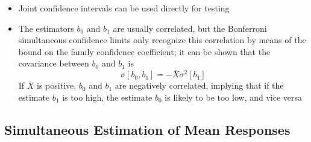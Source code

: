 \begin{itemize}
\item Joint confidence intervals can be used directly for testing
\item The estimators $b_0$ and $b_1$ are usually correlated, but the Bonferroni simultaneous confidence limits only recognize this correlation by means of the bound on the family confidence coefficient; it can be shown that the covariance between $b_0$ and $b_1$ is $$ \sigma[b_0, b_1] = -\overline{X}\sigma^2[b_1] $$ 
If $\overline{X}$ is positive, $b_0$ and $b_1$ are negatively correlated, implying that if the estimate $b_1$ is too high, the estimate $b_0$ is likely to be too low, and vice versa 
\end{itemize} 

\subsection{Simultaneous Estimation of Mean Responses}
